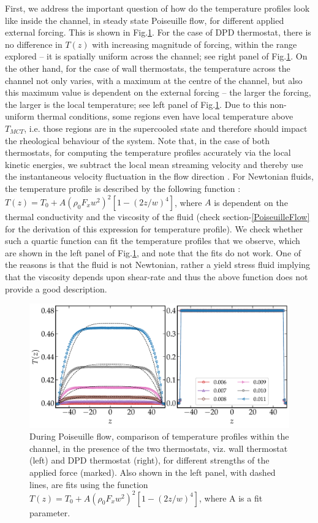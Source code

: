 First, we address the important question of how do the temperature profiles look like inside the channel, in steady state Poiseuille flow, for different applied external forcing. This is shown in Fig.\ref{fig3}. For the case of DPD thermostat, there is no difference in $T(z)$ with increasing magnitude of forcing, within the range explored -- it is spatially uniform across the channel; see right panel of Fig.\ref{fig3}. On the other hand, for the case of wall thermostats, the temperature across the channel not only varies, with a maximum at the centre of the channel, but also this maximum value is dependent on the external forcing -- the larger the forcing, the larger is the local temperature; see left panel of Fig.\ref{fig3}. Due to this non-uniform thermal conditions, some  regions even have local temperature above $T_{MCT}$, i.e. those regions are in the supercooled state and therefore should impact the rheological behaviour of the system. Note that, in the case of both thermostats, for computing the temperature profiles accurately via the local kinetic energies, we subtract the local mean streaming velocity and thereby use the instantaneous velocity fluctuation in the flow direction \cite{todd1995}. For Newtonian fluids, the temperature profile is described by the following function \cite{todd1995, binder2004molecular}: $T(z)=T_0 + A(\rho_0{F_x}w^2)^2[1-(2z/w)^4]$, where $A$ is dependent on the thermal conductivity and the viscosity of the fluid (check section-\ref{PoiseuilleFlow} for the derivation of this expression for temperature profile). We check whether such a quartic function can fit the temperature profiles that we observe, which are shown in the left panel of Fig.\ref{fig3}, and note that the fits do not work. One of the reasons is that the fluid is not Newtonian, rather a yield stress fluid implying that the viscosity depends upon shear-rate and thus the above function does not provide a good description.

\begin{figure}
\centering
\includegraphics[width=15cm]{figs/tempComb.pdf}
\caption[{\em During Poiseuille flow, comparison of temperature profiles within the channel, in the presence of the two thermostats}]{During Poiseuille flow, comparison of temperature profiles within the channel, in the presence of the two thermostats, viz. wall thermostat (left) and DPD thermostat (right), for different strengths of the applied force (marked).  Also shown in the left panel, with dashed lines, are fits using the function $T(z)=T_0 + A(\rho_0{F_x}w^2)^2[1-(2z/w)^4]$, where A is a fit parameter.}
\label{fig3}
\end{figure}

